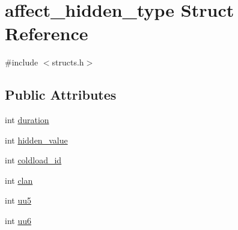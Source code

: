 \hypertarget{structaffect__hidden__type}{\section{affect\-\_\-hidden\-\_\-type Struct Reference}
\label{structaffect__hidden__type}
}


{\ttfamily \#include $<$structs.\-h$>$}

\subsection*{Public Attributes}
\begin{DoxyCompactItemize}
\item 
int \hyperlink{structaffect__hidden__type_a9ef7b18231870dde85d45304f785b33a}{duration}
\item 
int \hyperlink{structaffect__hidden__type_aa38b96b89c5510a33fe69c317105bfd9}{hidden\-\_\-value}
\item 
int \hyperlink{structaffect__hidden__type_af665303631d1d9e99e25b68ccb19a7c8}{coldload\-\_\-id}
\item 
int \hyperlink{structaffect__hidden__type_ad041ea2b0b58b321c6d321fc33ac745f}{clan}
\item 
int \hyperlink{structaffect__hidden__type_ae3f77e549637b130342f6a17fd66943b}{uu5}
\item 
int \hyperlink{structaffect__hidden__type_a80680a001f067f146110fa86d4127571}{uu6}
\end{DoxyCompactItemize}


